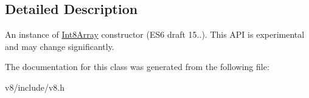 \subsection{Detailed Description}
An instance of \hyperlink{classv8_1_1Int8Array}{Int8\+Array} constructor (E\+S6 draft 15..). This A\+P\+I is experimental and may change significantly. 

The documentation for this class was generated from the following file\+:\begin{DoxyCompactItemize}
\item 
v8/include/v8.\+h\end{DoxyCompactItemize}
